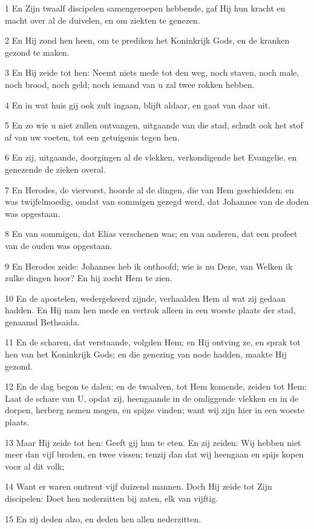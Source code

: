 \par 1 En Zijn twaalf discipelen samengeroepen hebbende, gaf Hij hun kracht en macht over al de duivelen, en om ziekten te genezen.
\par 2 En Hij zond hen heen, om te prediken het Koninkrijk Gods, en de kranken gezond te maken.
\par 3 En Hij zeide tot hen: Neemt niets mede tot den weg, noch staven, noch male, noch brood, noch geld; noch iemand van u zal twee rokken hebben.
\par 4 En in wat huis gij ook zult ingaan, blijft aldaar, en gaat van daar uit.
\par 5 En zo wie u niet zullen ontvangen, uitgaande van die stad, schudt ook het stof af van uw voeten, tot een getuigenis tegen hen.
\par 6 En zij, uitgaande, doorgingen al de vlekken, verkondigende het Evangelie, en genezende de zieken overal.
\par 7 En Herodes, de viervorst, hoorde al de dingen, die van Hem geschiedden; en was twijfelmoedig, omdat van sommigen gezegd werd, dat Johannes van de doden was opgestaan.
\par 8 En van sommigen, dat Elias verschenen was; en van anderen, dat een profeet van de ouden was opgestaan.
\par 9 En Herodes zeide: Johannes heb ik onthoofd; wie is nu Deze, van Welken ik zulke dingen hoor? En hij zocht Hem te zien.
\par 10 En de apostelen, wedergekeerd zijnde, verhaalden Hem al wat zij gedaan hadden. En Hij nam hen mede en vertrok alleen in een woeste plaats der stad, genaamd Bethsaida.
\par 11 En de scharen, dat verstaande, volgden Hem; en Hij ontving ze, en sprak tot hen van het Koninkrijk Gods; en die genezing van node hadden, maakte Hij gezond.
\par 12 En de dag begon te dalen; en de twaalven, tot Hem komende, zeiden tot Hem: Laat de schare van U, opdat zij, heengaande in de omliggende vlekken en in de dorpen, herberg nemen mogen, en spijze vinden; want wij zijn hier in een woeste plaats.
\par 13 Maar Hij zeide tot hen: Geeft gij hun te eten. En zij zeiden: Wij hebben niet meer dan vijf broden, en twee vissen; tenzij dan dat wij heengaan en spijs kopen voor al dit volk;
\par 14 Want er waren omtrent vijf duizend mannen. Doch Hij zeide tot Zijn discipelen: Doet hen nederzitten bij zaten, elk van vijftig.
\par 15 En zij deden alzo, en deden hen allen nederzitten.

